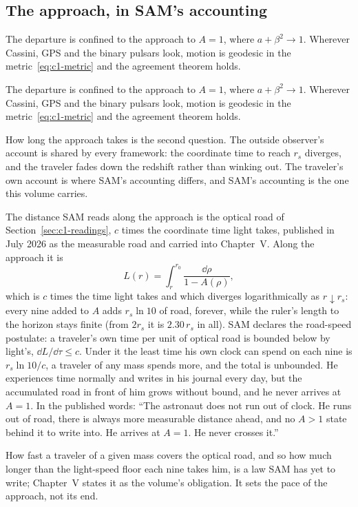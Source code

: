 \subsection{The approach, in SAM's accounting}
\label{sec:c1-approach}

The departure is confined to the approach to $A=1$, where $a+\beta^2\to1$. Wherever Cassini, GPS and the binary pulsars look, motion is geodesic in the metric~\eqref{eq:c1-metric} and the agreement theorem holds.
\label{sec:c1-approach}

The departure is confined to the approach to $A=1$, where $a+\beta^2\to1$. Wherever Cassini, GPS and the binary pulsars look, motion is geodesic in the metric~\eqref{eq:c1-metric} and the agreement theorem holds.

How long the approach takes is the second question. The outside observer's account is shared by every framework: the coordinate time to reach $r_s$ diverges, and the traveler fades down the redshift rather than winking out. The traveler's own account is where SAM's accounting differs, and SAM's accounting is the one this volume carries.

The distance SAM reads along the approach is the optical road of Section~\ref{sec:c1-readings}, $c$ times the coordinate time light takes, published in July 2026 as the measurable road and carried into Chapter~V. Along the approach it is
\begin{equation}
L(r)=\int_r^{r_0}\frac{\dd\rho}{1-A(\rho)},
\label{eq:c1-measurable-road}
\end{equation}
which is $c$ times the time light takes and which diverges logarithmically as $r\downarrow r_s$: every nine added to $A$ adds $r_s\ln 10$ of road, forever, while the ruler's length to the horizon stays finite (from $2r_s$ it is $2.30\,r_s$ in all). SAM declares the road-speed postulate: a traveler's own time per unit of optical road is bounded below by light's, $\dd L/\dd\tau\le c$. Under it the least time his own clock can spend on each nine is $r_s\ln10/c$, a traveler of any mass spends more, and the total is unbounded. He experiences time normally and writes in his journal every day, but the accumulated road in front of him grows without bound, and he never arrives at $A=1$. In the published words: ``The astronaut does not run out of clock. He runs out of road, there is always more measurable distance ahead, and no $A>1$ state behind it to write into. He arrives at $A=1$. He never crosses it.''

How fast a traveler of a given mass covers the optical road, and so how much longer than the light-speed floor each nine takes him, is a law SAM has yet to write; Chapter~V states it as the volume's obligation. It sets the pace of the approach, not its end.

